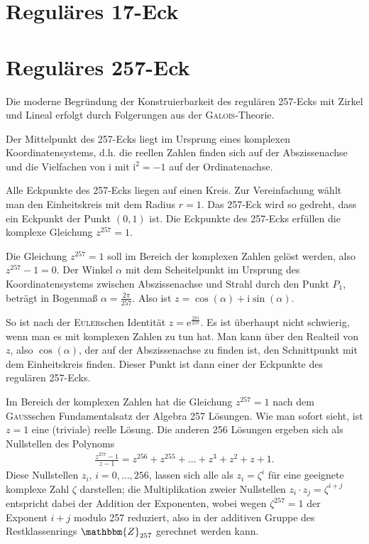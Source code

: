 \documentclass[11pt]{article}
\newcommand{\ii}{\mathrm{i}}
\newcommand{\Z}{\mathbbm{Z}}
\begin{document}
\section{Reguläres 17-Eck}

\section{Reguläres 257-Eck}

Die moderne Begründung der Konstruierbarkeit des regulären 257-Ecks mit Zirkel
und Lineal erfolgt durch Folgerungen aus der \textsc{Galois}-Theorie.

Der Mittelpunkt des 257-Ecks liegt im Ursprung eines komplexen
Koordinatensystems, d.h. die reellen Zahlen finden sich auf der Abszissenachse
und die Vielfachen von $\ii$ mit $\ii^{2}=-1$ auf der Ordinatenachse.

Alle Eckpunkte des 257-Ecks liegen auf einen Kreis. Zur Vereinfachung wählt
man den Einheitskreis mit dem Radius $r = 1$. Das 257-Eck wird so gedreht,
dass ein Eckpunkt der Punkt $(0,1)$ ist. Die Eckpunkte des 257-Ecks erfüllen
die komplexe Gleichung $z^{257} = 1$.

Die Gleichung $z^{257} =1$ soll im Bereich der komplexen Zahlen gelöst werden,
also $z^{257} - 1 = 0$. Der Winkel $\alpha$ mit dem Scheitelpunkt im Ursprung
des Koordinatensystems zwischen Abszissenachse und Strahl durch den Punkt
$P_1$, beträgt in Bogenmaß $\alpha= \frac{2\pi}{257}$. Also ist $z =
\cos(\alpha) + \ii\sin(\alpha)$.

So ist nach der \textsc{Euler}schen Identität $z =
\mathrm{e}^{\frac{2\pi\ii}{257}}$.  Es ist überhaupt nicht schwierig, wenn man
es mit komplexen Zahlen zu tun hat. Man kann über den Realteil von $z$, also
$\cos(\alpha)$, der auf der Abszissenachse zu finden ist, den Schnittpunkt mit
dem Einheitskreis finden. Dieser Punkt ist dann einer der Eckpunkte des
regulären 257-Ecks.

Im Bereich der komplexen Zahlen hat die Gleichung $z^{257} = 1$ nach dem
\textsc{Gauss}schen Fundamentalsatz der Algebra 257 Lösungen. Wie man sofort
sieht, ist $z = 1$ eine (triviale) reelle Lösung. Die anderen 256 Lösungen
ergeben sich als Nullstellen des Polynoms
\begin{gather*}
   \frac{z^{257}-1}{z-1}=z^{256}+z^{255}+\ldots+z^3+z^2+z+1.\tag{2}
\end{gather*}
Diese Nullstellen $z_i$, $i=0,\ldots,256$, lassen sich alle als $z_i=\zeta^i$
für eine geeignete komplexe Zahl $\zeta$ darstellen; die Multiplikation zweier
Nullstellen $z_i\cdot z_j=\zeta^{i+j}$ entspricht dabei der Addition der
Exponenten, wobei wegen $\zeta^{257}=1$ der Exponent $i+j$ modulo 257
reduziert, also in der additiven Gruppe des Restklassenrings $\Z_{257}$
gerechnet werden kann.
\end{document}
